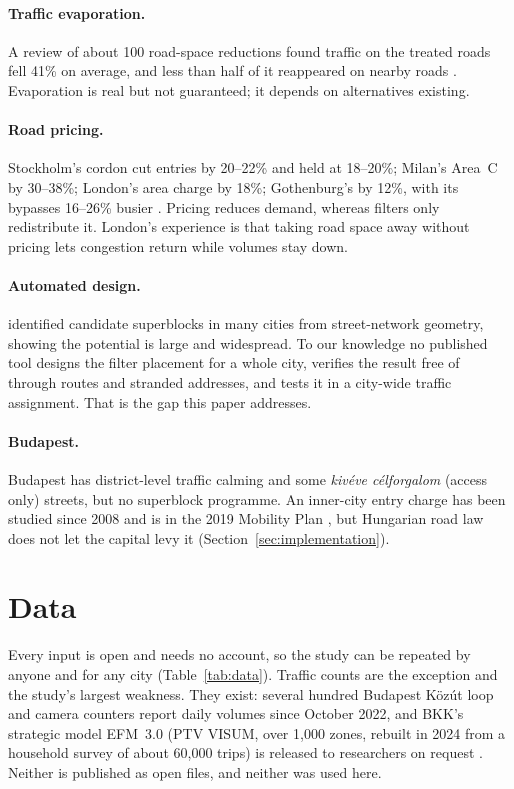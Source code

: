 \documentclass[11pt,a4paper]{article}
\begin{document}
\paragraph{Traffic evaporation.} A review of about 100 road-space reductions found traffic on the treated roads fell 41\% on average, and less than half of it reappeared on nearby roads \citep{cairns2002}. Evaporation is real but not guaranteed; it depends on alternatives existing.

\paragraph{Road pricing.} Stockholm's cordon cut entries by 20--22\% and held at 18--20\%; Milan's Area~C by 30--38\%; London's area charge by 18\%; Gothenburg's by 12\%, with its bypasses 16--26\% busier \citep{eliasson2009,borjesson2015,cts2012,itf,danielis}. Pricing reduces demand, whereas filters only redistribute it. London's experience is that taking road space away without pricing lets congestion return while volumes stay down.

\paragraph{Automated design.} \citet{eggimann2022} identified candidate superblocks in many cities from street-network geometry, showing the potential is large and widespread. To our knowledge no published tool designs the filter placement for a whole city, verifies the result free of through routes and stranded addresses, and tests it in a city-wide traffic assignment. That is the gap this paper addresses.

\paragraph{Budapest.} Budapest has district-level traffic calming and some \emph{kivéve célforgalom} (access only) streets, but no superblock programme. An inner-city entry charge has been studied since 2008 \citep{origo2013} and is in the 2019 Mobility Plan \citep{bkk}, but Hungarian road law does not let the capital levy it \citep{kuria2024} (Section~\ref{sec:implementation}).

\section{Data}\label{sec:data}

Every input is open and needs no account, so the study can be repeated by anyone and for any city (Table~\ref{tab:data}). Traffic counts are the exception and the study's largest weakness. They exist: several hundred Budapest Közút loop and camera counters report daily volumes since October 2022, and BKK's strategic model EFM~3.0 (PTV VISUM, over 1,000 zones, rebuilt in 2024 from a household survey of about 60,000 trips) is released to researchers on request \citep{bkkcounters,bkkefm}. Neither is published as open files, and neither was used here.
\end{document}
